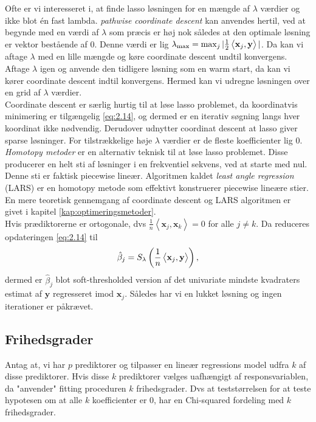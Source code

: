 Ofte er vi interesseret i, at finde lasso løsningen for en mængde af \(\lambda\) værdier og ikke blot én fast lambda.
\textit{pathwise coordinate descent} kan anvendes hertil, ved at begynde med en værdi af \(\lambda\) som præcis er høj nok således at den optimale løsning er vektor bestående af \(0\).
Denne værdi er lig \(\lambda_{\max}=\max_j \vert \frac{1}{2} \left\langle \mathbf{x}_j, \mathbf{y} \right\rangle \vert\).
Da kan vi aftage \(\lambda\) med en lille mængde og køre coordinate descent undtil konvergens.
Aftage \(\lambda\) igen og anvende den tidligere løsning som en warm start, da kan vi kører coordinate descent indtil konvergens.
Hermed kan vi udregne løsningen over en grid af \(\lambda\) værdier. \\

Coordinate descent er særlig hurtig til at løse lasso problemet, da koordinatvis minimering er tilgængelig \eqref{eq:2.14}, og dermed er en iterativ søgning langs hver koordinat ikke nødvendig.
Derudover udnytter coordinat descent at lasso giver sparse løsninger.
For tilstrækkelige høje \(\lambda\) værdier er de fleste koefficienter lig $0$. \\[2mm] 
%
\textit{Homotopy metoder} er en alternativ teknisk til at løse lasso problemet. Disse producerer en helt sti af løsninger i en frekventiel sekvens, ved at starte med nul.
Denne sti er faktisk piecewise lineær.
Algoritmen kaldet \textit{least angle regression} (LARS) er en homotopy metode som effektivt konstruerer piecewise lineære stier.
En mere teoretisk gennemgang af coordinate descent og LARS algoritmen er givet i kapitel \ref{kap:optimeringsmetoder}. \\[2mm]


Hvis prædiktorerne er ortogonale, dvs $\frac{1}{n} \left\langle \mathbf{x}_j, \mathbf{x}_k \right\rangle = 0$ for alle $j \neq k$.
Da reduceres opdateringen \eqref{eq:2.14} til
\begin{align*}
\hat{\beta}_j = S_\lambda \del{\frac{1}{n} \left\langle \mathbf{x}_j, \mathbf{y} \right\rangle},
\end{align*}
dermed er $\hat{\beta}_j$ blot soft-thresholded version af det univariate mindste kvadraters estimat af $\mathbf{y}$ regresseret imod $\mathbf{x}_j$. Således har vi en lukket løsning og ingen iterationer er påkrævet.

\subsection{Frihedsgrader}
Antag at, vi har \(p\) prediktorer og tilpasser en lineær regressions model udfra \(k\) af disse prediktorer.
Hvis disse \(k\) prediktorer vælges uafhængigt af responsvariablen, da "anvender" fitting proceduren \(k\) frihedsgrader.
Dvs at teststørrelsen for at teste hypotesen om at alle \(k\) koefficienter er 0, har en Chi-squared fordeling med \(k\) frihedsgrader.

